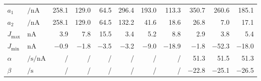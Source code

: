 \begin{table}[h!]
\begin{tabular}{l l   r r r   r r r   r r r}
		$a_1$ & $\si{\per\nano\ampere}$ &
		\num{258.1} & \num{129.0} & \num{64.5} &
		\num{296.4} & \num{193.0} & \num{113.3} &
		\num{350.7} & \num{260.6} & \num{185.1} \\

		$a_2$ & $\si{\per\nano\ampere}$ &
		\num{258.1} & \num{129.0} & \num{64.5} &
		\num{132.2} & \num{41.6} & \num{18.6} &
		\num{26.8} & \num{7.0} & \num{17.1} \\[2.5mm]

	
		$J_\mathrm{max}$ & $\si{\nano\ampere}$ &
		\num{3.9} & \num{7.8} & \num{15.5} &
		\num{3.4} & \num{5.2} & \num{8.8} &
		\num{2.9} & \num{3.8} & \num{5.4} \\

		$J_\mathrm{min}$ & $\si{\nano\ampere}$ &
		\num{-0.9} & \num{-1.8} & \num{-3.5} &
		\num{-3.2} & \num{-9.0} & \num{-18.9} &
		\num{-1.8} &\num{-52.3} & \num{-18.0} \\[2.5mm]

		$\alpha$ & $\si{\per\second\per\nano\ampere}$ &
		/&/&/&/&/&/&
		\num{51.3} & \num{51.5} & \num{51.3}
		\\
		$\beta$ & $\si{\per\second}$ &
		/&/&/&/&/&/&
		\num{-22.8} & \num{-25.1} & \num{-26.5}\\
		\bottomrule
	\end{tabular}
	\label{tbl:two_comp_model_parameters}
\end{table}
